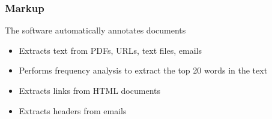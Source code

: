 \documentclass{beamer}
\begin{document}
  \begin{frame}
    \frametitle{Markup}
    The software automatically annotates documents\\
    \begin{itemize}
    \item{Extracts text from PDFs, URLs, text files, emails}
    \item{Performs frequency analysis to extract the top 20 words in the text}
    \item{Extracts links from HTML documents}
    \item{Extracts headers from emails}
    \end{itemize}
  \end{frame}
\end{document}
